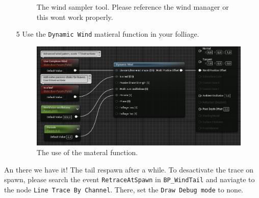 \documentclass[../main.tex]{subfile}
\begin{document}
\begin{itemize}
\begin{figure}[H]
            \caption{The wind sampler tool. Please reference the wind manager or this wont work properly.}
        \end{figure}
        \item[5] Use the \texttt{Dynamic Wind} matieral function in your folliage.
        \begin{figure}[H]    
            \centering
            \includegraphics[width=.75\textwidth]{Ressources/MaterialInstance.png}
            \caption{The use of the materal function.}
        \end{figure}
    \end{itemize}

    An there we have it! The tail respawn after a while. To desactivate the trace on spawn, please search the event \texttt{RetraceAtSpawn}
     in \texttt{BP\_WindTail} and naviagte to the node \texttt{Line Trace By Channel}. There, set the \texttt{Draw Debug mode} to none.
\end{document}
